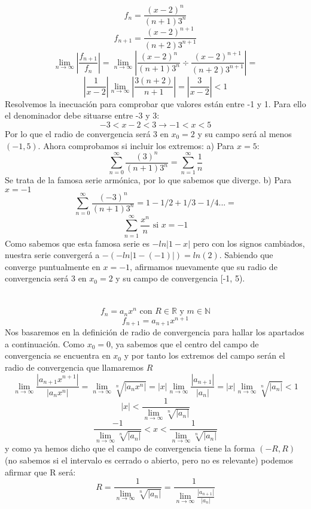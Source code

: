 \documentclass[12pt,a4paper,oneside,onecolumn]{article}
\begin{document}
    \[
    f_{n} = \frac{(x-2)^n}{(n+1)3^n}
    \]
    \[
    f_{n+1} = \frac{(x-2)^{n+1}}{(n+2)3^{n+1}}
    \]
    \[
        \lim_{n\to\infty}{\left| \frac{f_{n+1}}{f_n} \right|} =\lim_{n\to\infty}{\left| \frac{(x-2)^n}{(n+1)3^n} \div \frac{(x-2)^{n+1}}{(n+2)3^{n+1}}  \right|} =
    \]
    \[
        \left|\frac{1}{x-2}\right|\lim_{n\to\infty}{\left|\frac{3(n+2)}{n+1}\right|} = \left|\frac{3}{x-2}\right| < 1
    \]
    Resolvemos la inecuaci\'on para comprobar que valores est\'an entre -1 y 1. Para ello el denominador debe situarse entre -3 y 3:
    \[
    -3 < x-2 < 3 \rightarrow -1 < x < 5
    \]
    Por lo que el radio de convergencia ser\'a 3 en $x_0 = 2$ y su campo ser\'a al menos $(-1, 5)$. Ahora comprobamos si incluir los extremos:
    \newline a) Para $x = 5$:
    \[
        \sum_{n=0}^{\infty}{\frac{(3)^n}{(n+1)3^n}} = \sum_{n=1}^{\infty}{\frac{1}{n}}
    \]
    Se trata de la famosa serie arm\'onica, por lo que sabemos que diverge.
    \newline b) Para $x = -1$
    \[
        \sum_{n=0}^{\infty}{\frac{(-3)^n}{(n+1)3^n}} = 1 -1/2 +1/3 -1/4... =
    \]
    \[
        \sum_{n=1}^{\infty}{\frac{x^n}{n}} \text{   si   } x = -1
    \]
    Como sabemos que esta famosa serie es $-ln|1-x|$ pero con los signos cambiados, nuestra serie converger\'a a $-(-ln|1-(-1)|) = ln(2)$.
    \newline \newline
    Sabiendo que converge puntualmente en $x = -1$, afirmamos nuevamente que su radio de convergencia ser\'a 3 en $x_0 = 2$ y su campo de convergencia [-1, 5).
    \newpage
    
    \section{}
    
    \[
        f_n = a_n x^n \text{ con } R\in \mathbb{R} \text{ y } m \in \mathbb{N}
    \]
    \[
        f_{n+1} =a_{n+1}x^{n+1}
    \]
    Nos basaremos en la definici\'on de radio de convergencia para hallar los apartados a continuaci\'on. Como $x_0 = 0$, ya sabemos que el centro del campo de convergencia se encuentra en $x_0$ y por tanto los extremos del campo ser\'an el radio de convergencia que llamaremos $R$
    \[
        \lim_{n\to\infty}{\frac{|a_{n+1}x^{n+1}|}{|a_n x^n|}} = \lim_{n\to\infty}{\sqrt[n]{|a_nx^n|}} = |x|\lim_{n\to\infty}{\frac{|a_{n+1}|}{|a_n|}} = |x|\lim_{n\to\infty}{\sqrt[n]{|a_n|}} < 1
    \]
    \[
        |x| < \frac{1}{\lim_{n\to\infty}{\sqrt[n]{|a_n|}}}
    \]
    \[
        \frac{-1}{\lim_{n\to\infty}{\sqrt[n]{|a_n|}}} < x < \frac{1}{\lim_{n\to\infty}{\sqrt[n]{|a_n|}}}
    \]
    y como ya hemos dicho que el campo de convergencia tiene la forma $(-R, R)$ (no sabemos si el intervalo es cerrado o abierto, pero no es relevante) podemos afirmar que R ser\'a:
    \[
        R = \frac{1}{\lim_{n\to\infty}{\sqrt[n]{|a_n|}}} = \frac{1}{\lim_{n\to\infty}\frac{|a_{n+1}|}{|a_n|}}
    \]
    
\end{document}
